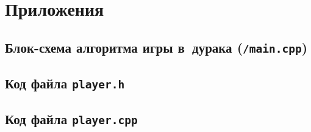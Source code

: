 \documentclass[a4paper,12pt]{article}
\begin{document}
    \section{Приложения}
    \hypertarget{rulesimg}{\subsection{Блок-схема алгоритма игры в~дурака (\texttt{/main.cpp})}}
    \begin{figure}[h!]
    \end{figure}
    \newpage
	\hypertarget{CodePlayerH}{\subsection{Код файла \texttt{player.h}}}
	\hypertarget{CodePlayerCPP}{\subsection{Код файла \texttt{player.cpp}}}

\end{document}
